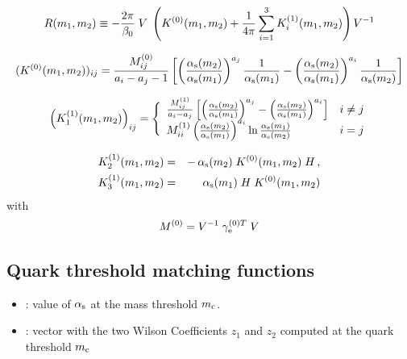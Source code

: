 \begin{equation}
R(m_1,m_2) \equiv -\frac{2\pi}{\beta_0} \; V \; \left(
                 K^{(0)}(m_1,m_2) +
                 \frac{1}{4\pi} \sum_{i=1}^{3} K_i^{(1)}(m_1,m_2)
                 \right) V^{-1}
\end{equation}

\begin{equation}
(K^{(0)}(m_1,m_2))_{ij} = \frac{M^{(0)}_{ij}}{a_i - a_j - 1}
\left[
\left( \frac{\alpha_{\rm s}(m_2)}{\alpha_{\rm s}(m_1)} \right)^{a_j} \frac{1}{\alpha_{\rm s}(m_1)} -
\left( \frac{\alpha_{\rm s}(m_2)}{\alpha_{\rm s}(m_1)} \right)^{a_i} \frac{1}{\alpha_{\rm s}(m_2)}
\right] 
\label{eq:K0}
\end{equation}

\begin{equation}
\left( K_1^{(1)}(m_1,m_2) \right)_{ij} =
\Bigg\lbrace
\begin{array}{ll}
\frac{M^{(1)}_{ij}}{a_i - a_j}
\left[ \left( \frac{\alpha_{\rm s}(m_2)}{\alpha_{\rm s}(m_1)} \right)^{a_j} -
       \left( \frac{\alpha_{\rm s}(m_2)}{\alpha_{\rm s}(m_1)} \right)^{a_i} \right] & i \not= j \\
M^{(1)}_{ii} \left( \frac{\alpha_{\rm s}(m_2)}{\alpha_{\rm s}(m_1)} \right)^{a_i}
             \ln\frac{\alpha_{\rm s}(m_1)}{\alpha_{\rm s}(m_2)}             & i=j
\end{array} 
\label{eq:K11}
\end{equation}

\begin{eqnarray}
K_2^{(1)}(m_1,m_2) & = &
-\,\alpha_{\rm s}(m_2) \; K^{(0)}(m_1,m_2) \; H \, ,
\label{eq:K12} \\
K_3^{(1)}(m_1,m_2) & = &
\phantom{-}\,\alpha_{\rm s}(m_1) \; H \; K^{(0)}(m_1,m_2)
\label{eq:K13}
\end{eqnarray}
with
\begin{equation}
M^{(0)} = V^{-1} \; \gamma_{\rm e}^{(0) T} \; V
\end{equation}

\subsection{Quark threshold matching functions}


\begin{itemize}
\item {}: value of $\alpha_{\rm s}$ at the mass threshold $m_{\mathrm c}$.
\item {}: vector with the two Wilson Coefficients $z_1$ and $z_2$ computed at the
quark threshold $m_{\mathrm c}$
\end{itemize}

